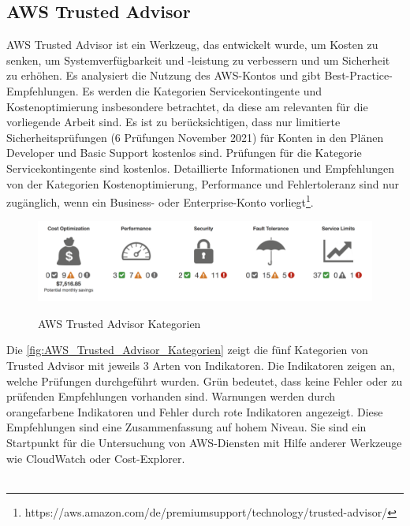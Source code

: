 \subsection{AWS Trusted Advisor}

AWS Trusted Advisor ist ein Werkzeug, das entwickelt wurde, um Kosten zu senken, um Systemverfügbarkeit und -leistung zu verbessern und um Sicherheit zu erhöhen. Es analysiert die Nutzung des AWS-Kontos und gibt Best-Practice-Empfehlungen. Es werden die Kategorien Servicekontingente und Kostenoptimierung insbesondere betrachtet, da diese am relevanten für die vorliegende Arbeit sind. Es ist zu berücksichtigen, dass nur limitierte Sicherheitsprüfungen (6 Prüfungen November 2021) für Konten in den Plänen Developer und Basic Support kostenlos sind. Prüfungen für die Kategorie Servicekontingente sind kostenlos. Detaillierte Informationen und Empfehlungen von der Kategorien Kostenoptimierung, Performance und Fehlertoleranz sind nur zugänglich, wenn ein Business- oder Enterprise-Konto vorliegt\footnote{https://aws.amazon.com/de/premiumsupport/technology/trusted-advisor/}. \\

\begin{figure}[h!]
      \centering
      \includegraphics[scale=0.4]{sources/AWS_Trusted_Advisor_Kategorien}
      \caption[AWS Trusted Advisor Kategorien]{}
      \label{fig:AWS_Trusted_Advisor_Kategorien} 
      AWS Trusted Advisor Kategorien\cite{AMZ20}
\end{figure}
Die \autoref{fig:AWS_Trusted_Advisor_Kategorien} zeigt die fünf Kategorien von Trusted Advisor mit jeweils 3 Arten von Indikatoren. Die Indikatoren zeigen an, welche Prüfungen durchgeführt wurden. Grün bedeutet, dass keine Fehler oder zu prüfenden Empfehlungen vorhanden sind. Warnungen werden durch orangefarbene Indikatoren und Fehler durch rote Indikatoren angezeigt. Diese Empfehlungen sind eine Zusammenfassung auf hohem Niveau. Sie sind ein Startpunkt für die Untersuchung von AWS-Diensten mit Hilfe anderer Werkzeuge wie CloudWatch oder Cost-Explorer.%
\\\\

